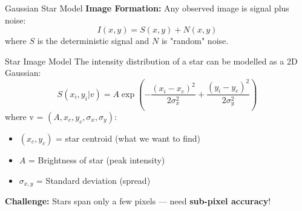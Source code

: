 \begin{frame}{Gaussian Star Model}
    \textbf{Image Formation:} Any observed image is signal plus noise:
    \[
    I(x, y) = S(x, y) + N(x, y)
    \]
    where $S$ is the deterministic signal and $N$ is "random" noise.
    
    \vspace{0.3cm}
    \begin{block}{Star Image Model}
        The intensity distribution of a star can be modelled as a 2D Gaussian:
        \[
        S(x_i, y_i | v) = A \exp\left(-\frac{(x_i-x_c)^2}{2 \sigma_x^2} + \frac{(y_i-y_c)^2}{2\sigma_y^2}\right) 
        \]
        where v = $(A, x_c, y_c, \sigma_x, \sigma_y)$:
        \begin{itemize} 
            \item $(x_c, y_c)$ = star centroid (what we want to find)
            \item $A$ = Brightness of star (peak intensity)
            \item $\sigma_{x,y}$ = Standard deviation (spread)
        \end{itemize}
    \end{block}
    
    \vspace{0.3cm}
    \textbf{Challenge:} Stars span only a few pixels — need \textbf{sub-pixel accuracy}!
\end{frame}


